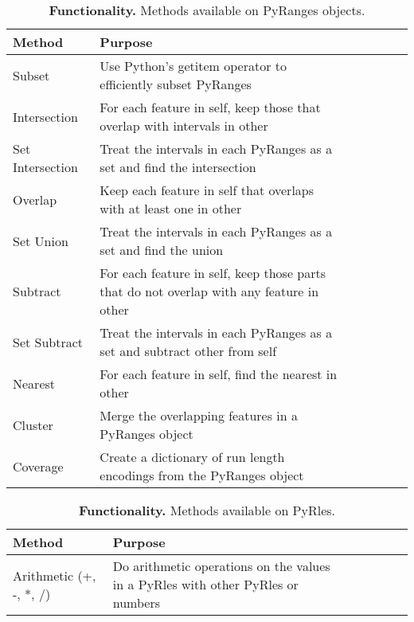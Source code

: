 \documentclass[10pt,letterpaper]{article}
\begin{document}
\begin{table}[!ht]
\begin{adjustwidth}{-1.5in}{0in} %
\centering
\caption{{\bf Functionality.} Methods available on PyRanges objects.}
\begin{tabular}{|l|l|l|l|l|l|l|}
\hline
  {\bf Method} & {\bf Purpose} \\ \hline
  Subset & Use Python's getitem operator to efficiently subset PyRanges \\ \hline
  Intersection & For each feature in self, keep those that overlap with intervals in other \footnotemark \\ \hline
  Set Intersection & Treat the intervals in each PyRanges as a set and find the intersection \footnotemark \\ \hline
  Overlap & Keep each feature in self that overlaps with at least one in other \\ \hline
  Set Union & Treat the intervals in each PyRanges as a set and find the union \\ \hline
  Subtract & For each feature in self, keep those parts that do not overlap with any feature in other \\ \hline
  Set Subtract & Treat the intervals in each PyRanges as a set and subtract other from self \\ \hline
  Nearest & For each feature in self, find the nearest in other \\ \hline
  Cluster & Merge the overlapping features in a PyRanges object \\ \hline
  Coverage & Create a dictionary of run length encodings from the PyRanges object \\ \hline
\end{tabular}
\label{tab1}
\end{adjustwidth}
\end{table}

\begin{table}[!ht]
\begin{adjustwidth}{-1.5in}{0in} %
\centering
\caption{{\bf Functionality.} Methods available on PyRles.}
\begin{tabular}{|l|l|l|l|l|l|l|}
\hline
  {\bf Method} & {\bf Purpose} \\ \hline
  Arithmetic (+, -, *, /) & Do arithmetic operations on the values in a PyRles with other PyRles or numbers \\ \hline
\end{tabular}
\label{tab1}
\end{adjustwidth}
\end{table}
\end{document}
